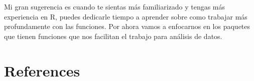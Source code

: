\documentclass[
  letterpaper,
  DIV=11,
  numbers=noendperiod]{scrreprt}
\newlength{\cslhangindent}
\newenvironment{CSLReferences}[2] %
 {\begin{list}{}{%
  \setlength{\itemindent}{0pt}
  \setlength{\leftmargin}{0pt}
  \setlength{\parsep}{0pt}
  \ifodd #1
   \setlength{\leftmargin}{\cslhangindent}
   \setlength{\itemindent}{-1\cslhangindent}
  \fi
  \setlength{\itemsep}{#2\baselineskip}}}
 {\end{list}}
\begin{document}
Mi gran sugerencia es cuando te sientas más familiarizado y tengas más
experiencia en R, puedes dedicarle tiempo a aprender sobre como trabajar
más profundamente con las funciones. Por ahora vamos a enfocarnos en los
paquetes que tienen funciones que nos facilitan el trabajo para análisis
de datos.


\chapter*{References}\label{references}


\label{refs}
\begin{CSLReferences}{0}{1}
\end{CSLReferences}
\end{document}
